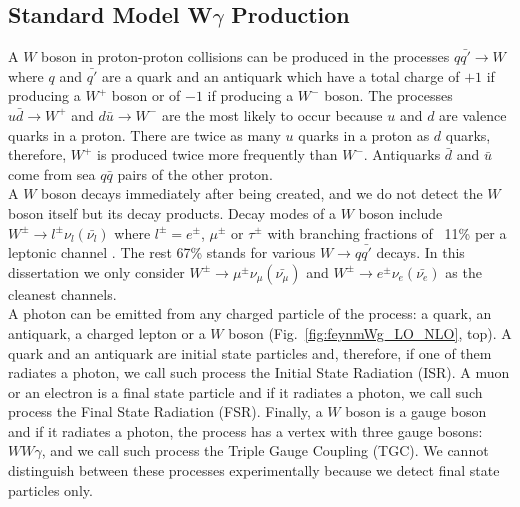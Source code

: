 \subsection{Standard Model W$\gamma$ Production}
\label{WgAbout_SMproduction}

A $W$ boson in proton-proton collisions can be produced in the processes $q {\bar{q'}} \rightarrow W$ where $q$ and $\bar{q'}$ are a quark and an antiquark which have a total charge of $+1$ if producing a $W^+$ boson or of $-1$ if producing a $W^-$ boson. The processes $u\bar{d}\rightarrow W^+$ and $d\bar{u}\rightarrow W^-$ are the most likely to occur because $u$ and $d$ are valence quarks in a proton. There are twice as many $u$ quarks in a proton as $d$ quarks, therefore, $W^+$ is produced twice more frequently than $W^-$. Antiquarks $\bar{d}$ and $\bar{u}$ come from sea $q\bar{q}$ pairs of the other proton.\\

A $W$ boson decays immediately after being created, and we do not detect the $W$ boson itself but its decay products. Decay modes of a $W$ boson include $W^\pm \rightarrow l^\pm \nu_l ({\bar{\nu_l}})$ where $l^\pm=e^\pm$, $\mu^\pm$ or $\tau^\pm$ with branching fractions of ~11\% per a leptonic channel \cite{ref_PDG}. The rest 67\% stands for various $W\rightarrow q\bar{q'}$ decays. In this dissertation we only consider $W^\pm \rightarrow \mu^\pm \nu_\mu ({\bar{\nu_\mu}})$ and $W^\pm \rightarrow e^\pm \nu_e ({\bar{\nu_e}})$ as the cleanest channels.\\


A photon can be emitted from any charged particle of the process: a quark, an antiquark, a charged lepton or a $W$ boson (Fig.~\ref{fig:feynmWg_LO_NLO}, top). A quark and an antiquark are initial state particles and, therefore, if one of them radiates a photon, we call such process the Initial State Radiation (ISR). A muon or an electron is a final state particle and if it radiates a photon, we call such process the Final State Radiation (FSR). Finally, a $W$ boson is a gauge boson and if it radiates a photon, the process has a vertex with three gauge bosons: $WW\gamma$, and we call such process the Triple Gauge Coupling (TGC). We cannot distinguish between these processes experimentally because we detect final state particles only.\\

